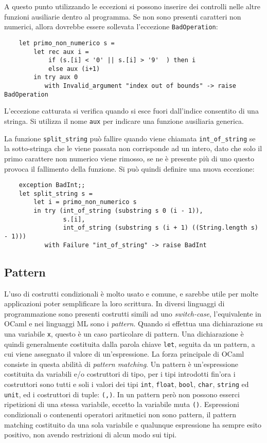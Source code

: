 \documentclass{article}
\numberwithin{equation}{subsection}
\begin{document}
A questo punto utilizzando le eccezioni si possono inserire dei controlli nelle altre funzioni ausiliarie dentro al programma. Se non sono presenti caratteri non numerici, allora dovrebbe essere sollevata l'eccezione \verb|BadOperation|:
\begin{verbatim}
    let primo_non_numerico s =
        let rec aux i = 
            if (s.[i] < '0' || s.[i] > '9'  ) then i
            else aux (i+1)
        in try aux 0
           with Invalid_argument "index out of bounds" -> raise BadOperation
\end{verbatim}
L'eccezione catturata si verifica quando si esce fuori dall'indice consentito di una stringa. Si utilizza il nome \verb|aux| per indicare una funzione ausiliaria generica. 

La funzione \verb|split_string| può fallire quando viene chiamata \verb|int_of_string| se la sotto-stringa che le viene passata non corrisponde ad un intero, dato che solo il primo carattere non numerico viene rimosso, se ne è presente più di uno questo provoca il fallimento della funzione. Si può quindi definire una nuova eccezione:
\begin{verbatim}
    exception BadInt;;
    let split_string s =
        let i = primo_non_numerico s 
        in try (int_of_string (substring s 0 (i - 1)),
                s.[i],
                int_of_string (substring s (i + 1) ((String.length s) - 1)))
           with Failure "int_of_string" -> raise BadInt
\end{verbatim}

\subsection{Pattern}

L'uso di costrutti condizionali è molto usato e comune, e sarebbe utile per molte applicazioni poter semplificare la loro scrittura. In diversi linguaggi di programmazione sono presenti costrutti simili ad uno \textit{switch-case}, l'equivalente in OCaml e nei linguaggi ML sono i \textit{pattern}. 
Quando si effettua una dichiarazione su una variabile \verb|x|, questo è un caso particolare di pattern. 
Una dichiarazione è quindi generalmente costituita dalla parola chiave \verb|let|, seguita da un pattern, a cui viene assegnato il valore di un'espressione. 
La forza principale di OCaml consiste in questa abilità di \textit{pattern matching}. Un pattern è un'espressione costituita da variabili e/o costruttori di tipo, per i tipi introdotti fin'ora i costruttori sono tutti e soli i valori dei tipi \verb|int|, \verb|float|, \verb|bool|, \verb|char|, \verb|string| ed \verb|unit|, ed i costruttori di tuple: \verb|(,)|. In un pattern però non possono esserci ripetizioni di una stessa variabile, eccetto la variabile muta \verb|()|. 
Espressioni condizionali o contenenti operatori aritmetici non sono pattern, il pattern matching costituito da una sola variabile e qualunque espressione ha sempre esito positivo, non avendo restrizioni di alcun modo sui tipi. 
\end{document}
